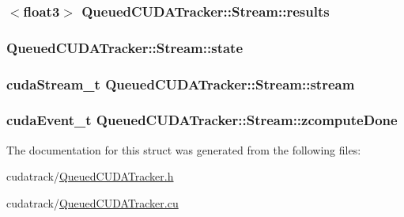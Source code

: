 \subsubsection[{\texorpdfstring{results}{results}}]{$<$float3$>$ Queued\+C\+U\+D\+A\+Tracker\+::\+Stream\+::results}\hypertarget{struct_queued_c_u_d_a_tracker_1_1_stream_ab9e7576fe16b9a1f6f24b126bf3a59b3}{}\label{struct_queued_c_u_d_a_tracker_1_1_stream_ab9e7576fe16b9a1f6f24b126bf3a59b3}
\subsubsection[{\texorpdfstring{state}{state}}]{ Queued\+C\+U\+D\+A\+Tracker\+::\+Stream\+::state}\hypertarget{struct_queued_c_u_d_a_tracker_1_1_stream_ab609f91457378960151e374bd3d4f8c2}{}\label{struct_queued_c_u_d_a_tracker_1_1_stream_ab609f91457378960151e374bd3d4f8c2}
\subsubsection[{\texorpdfstring{stream}{stream}}]{\setlength{\rightskip}{0pt plus 5cm}cuda\+Stream\+\_\+t Queued\+C\+U\+D\+A\+Tracker\+::\+Stream\+::stream}\hypertarget{struct_queued_c_u_d_a_tracker_1_1_stream_af5b983f7fe37fab223588226b8cee4f3}{}\label{struct_queued_c_u_d_a_tracker_1_1_stream_af5b983f7fe37fab223588226b8cee4f3}
\subsubsection[{\texorpdfstring{zcompute\+Done}{zcomputeDone}}]{\setlength{\rightskip}{0pt plus 5cm}cuda\+Event\+\_\+t Queued\+C\+U\+D\+A\+Tracker\+::\+Stream\+::zcompute\+Done}\hypertarget{struct_queued_c_u_d_a_tracker_1_1_stream_aa61e1ea38a74c9bd32435bd1ba0eb4d4}{}\label{struct_queued_c_u_d_a_tracker_1_1_stream_aa61e1ea38a74c9bd32435bd1ba0eb4d4}


The documentation for this struct was generated from the following files\+:\begin{DoxyCompactItemize}
\item 
cudatrack/\hyperlink{_queued_c_u_d_a_tracker_8h}{Queued\+C\+U\+D\+A\+Tracker.\+h}\item 
cudatrack/\hyperlink{_queued_c_u_d_a_tracker_8cu}{Queued\+C\+U\+D\+A\+Tracker.\+cu}\end{DoxyCompactItemize}
